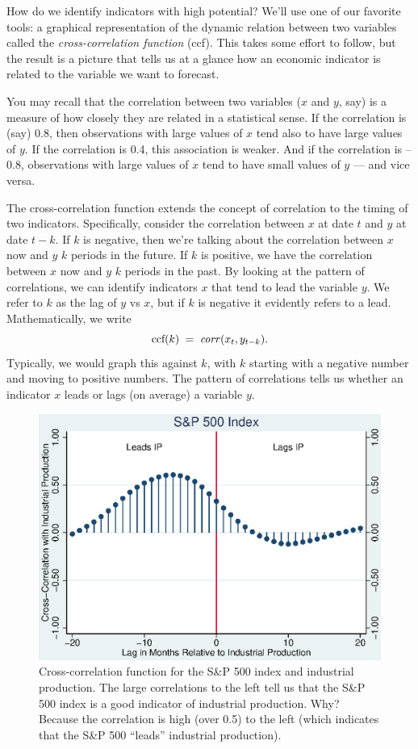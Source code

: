 \documentclass[letterpaper,12pt]{article}
\begin{document}
How do we identify indicators with high potential?  
We'll use one of our favorite tools:  
a graphical representation of the dynamic
relation between two variables 
called the {\it cross-correlation function\/} (ccf).
This takes some effort to follow, but the result
is a picture that tells us at a glance how an economic 
indicator is related to the variable we want to forecast.  

You may recall that the correlation between two variables
($x$ and $y$, say) is a measure of 
how closely they are related in a statistical sense.
If the correlation is (say) 0.8, 
then observations with large values of $x$ 
tend also to have large values of $y$.
If the correlation is 0.4, this association is weaker.
And if the correlation is --0.8, 
observations with large values of $x$ 
tend to have small values of $y$ --- and vice versa. 


The cross-correlation function extends the concept of correlation
to the timing of two indicators.
Specifically, consider the correlation between $x$ at date $t$ 
and $y$ at date $t-k$.  If $k$ is negative, 
then we're talking about the correlation 
between $x$ now and $y$ $k$ periods in the future.  
If $k$ is positive, we have the correlation between $x$ now and 
$y$ $k$ periods in the past.  
By looking at the pattern of correlations, 
we can identify indicators $x$ that tend to lead the variable $y$.
We refer to $k$ as the lag of $y$ vs $x$, 
but if $k$ is negative it evidently refers to a lead.  
Mathematically, we write 
\[
    \mbox{ccf}(k) \;=\;  \mbox{\it corr\/} (x_t,y_{t-k}) .
\]
Typically, we would graph this against $k$, with $k$ starting 
with a negative number and moving to positive numbers.
The pattern of correlations tells us whether an indicator $x$ 
leads or lags (on average) a variable $y$.  


\begin{figure}
    \centering
    \includegraphics[scale=0.8]{xcsp500.eps}
    \caption{Cross-correlation function for 
    the S\&P 500 index and industrial production.
    The large correlations to the left tell us that 
    the S\&P 500 index is a good indicator of industrial production.
    Why?  Because the correlation is high (over 0.5) to the left
    (which indicates that the S\&P 500 ``leads'' industrial production).} 
    \label{fig:ccf-sp500}%
\end{figure}
\end{document}
